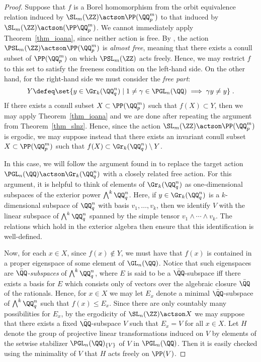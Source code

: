 \documentclass[oneside,leqno,11pt]{amsart}
\begin{document}
\begin{proof}
  Suppose that $f$ is a Borel homomorphism from the orbit equivalence
  relation induced by $\SL_m(\ZZ)\actson\PP(\QQ_p^m)$ to that induced
  by $\SL_m(\ZZ)\actson(\PP\QQ_p^m)$.  We cannot immediately apply
  Theorem~\ref{thm_ioana}, since neither action is free.  By
  \cite[Lemma~6.2]{super}, the action $\PSL_m(\ZZ)\actson\PP(\QQ_p^m)$
  is \emph{almost free}, meaning that there exists a conull subset of
  $\PP(\QQ_p^m)$ on which $\PSL_m(\ZZ)$ acts freely.  Hence, we may
  restrict $f$ to this set to satisfy the freeness condition on the
  left-hand side.  On the other hand, for the right-hand side we must
  consider the \emph{free part}:
  \[Y\defeq\set{y\in\Gr_k(\QQ_q^n)\mid1\neq\gamma\in\PGL_n(\QQ)\implies\gamma y\neq y}\;.
  \]
  If there exists a conull subset $X\subset\PP(\QQ_p^m)$ such that
  $f(X)\subset Y$, then we may apply Theorem~\ref{thm_ioana} and we
  are done after repeating the argument from Theorem~\ref{thm_slnz}.
  Hence, since the action $\SL_m(\ZZ)\actson\PP(\QQ_p^m)$ is ergodic,
  we may suppose instead that there exists an invariant conull subset
  $X\subset\PP(\QQ_p^m)$ such that $f(X)\subset\Gr_k(\QQ_q^n)\setminus
  Y$.

  In this case, we will follow the argument found in
  \cite[Lemma~5.1]{plocal} to replace the target action
  $\PGL_n(\QQ)\actson \Gr_k(\QQ_q^n)$ with a closely related free
  action.  For this argument, it is helpful to think of elements of
  $\Gr_k(\QQ_q^n)$ as one-dimensional subspaces of the exterior power
  $\bigwedge^k\QQ_q^n$.  Here, if $y\in\Gr_k(\QQ_q^n)$ is a
  $k$-dimensional subspace of $\QQ_q^n$ with basis $v_1,\ldots,v_k$,
  then we identify $V$ with the linear subspace of
  $\bigwedge^k\QQ_q^n$ spanned by the simple tensor
  $v_1\wedge\cdots\wedge v_k$.  The relations which hold in the
  exterior algebra then ensure that this identification is
  well-defined.
  
  Now, for each $x\in X$, since $f(x)\notin Y$, we must have
  that $f(x)$ is contained in a proper eigenspace of some element of
  $\GL_n(\QQ)$.  Notice that such eigenspaces are
  \emph{$\bar\QQ$\nobreakdash-subspaces} of $\bigwedge^k\QQ_q^n$,
  where $E$ is said to be a $\bar\QQ$\nobreakdash-subspace iff there
  exists a basis for $E$ which consists only of vectors over the
  algebraic closure $\bar\QQ$ of the rationals.  Hence, for $x\in X$
  we may let $E_x$ denote a minimal $\bar\QQ$\nobreakdash-subspace of
  $\bigwedge^k\QQ_q^n$ such that $f(x)\leq E_x$.  Since there are only
  countably many possibilities for $E_x$, by the ergodicity of
  $\SL_n(\ZZ)\actson X$ we may suppose that there exists a fixed
  $\bar\QQ$\nobreakdash-subspace $V$ such that $E_x=V$ for all $x\in
  X$.  Let $H$ denote the group of projective linear transformations
  induced on $V$ by elements of the setwise stabilizer
  $\PGL_n(\QQ)_{\{V\}}$ of $V$ in $\PGL_n(\QQ)$.  Then it is easily
  checked using the minimality of $V$ that $H$ acts freely on
  $\PP(V)$.


\end{proof}
\end{document}
